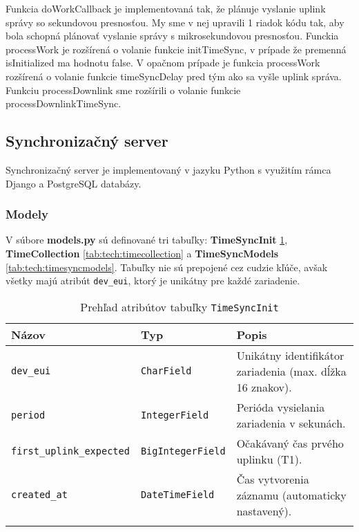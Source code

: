 Funkcia doWorkCallback je implementovaná tak, že plánuje vyslanie uplink správy so sekundovou presnosťou. My sme v nej upravili 1 riadok kódu tak, aby bola schopná plánovať vyslanie správy s mikrosekundovou presnosťou.
Funckia processWork je rozšírená o volanie funkcie initTimeSync, v prípade že premenná isInitialized ma hodnotu false. V opačnom prípade je funkcia processWork rozšírená o volanie funkcie timeSyncDelay pred tým ako sa vyšle uplink správa. Funkciu processDownlink sme rozšírili o volanie funkcie processDownlinkTimeSync.

\subsection{Synchronizačný server}

Synchronizačný server je implementovaný v jazyku Python s využitím rámca Django a PostgreSQL databázy. 

\subsubsection{Modely}

V súbore \textbf{models.py} sú definované tri tabuľky: \textbf{TimeSyncInit} \ref{tab:tech:timesyncinit}, \textbf{TimeCollection} \ref{tab:tech:timecollection} a \textbf{TimeSyncModels} \ref{tab:tech:timesyncmodels}. Tabuľky nie sú prepojené cez cudzie kľúče, avšak všetky majú atribút \texttt{dev\_eui}, ktorý je unikátny pre každé zariadenie. 

\begin{table}[H]
    \centering
    \caption{Prehľad atribútov tabuľky \texttt{TimeSyncInit}}
    \begin{tabular}{|l|l|p{8cm}|}
    \hline
    \textbf{Názov} & \textbf{Typ} & \textbf{Popis} \\
    \hline
    \texttt{dev\_eui} & \texttt{CharField} & Unikátny identifikátor zariadenia (max. dĺžka 16 znakov). \\
    \texttt{period} & \texttt{IntegerField} & Perióda vysielania zariadenia v sekunách. \\
    \texttt{first\_uplink\_expected} & \texttt{BigIntegerField} & Očakávaný čas prvého uplinku (T1). \\
    \texttt{created\_at} & \texttt{DateTimeField} & Čas vytvorenia záznamu (automaticky nastavený). \\
    \hline
    \label{tab:tech:timesyncinit}
    \end{tabular}
\end{table}

